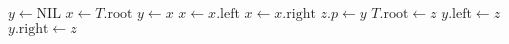\begin{algorithmic}
\State $y \leftarrow \text{NIL}$
\State $x \leftarrow T.\mathrm{root}$
  \State $y \leftarrow x$
    \State $x \leftarrow x.\mathrm{left}$
  \Else
    \State $x \leftarrow x.\mathrm{right}$
  \EndIf
\EndWhile
\State $z.p \leftarrow y$
  \State $T.\mathrm{root} \leftarrow z$ 
  \State $y.\mathrm{left} \leftarrow z$
\Else
  \State $y.\mathrm{right} \leftarrow z$
\EndIf
\EndFunction
\end{algorithmic}
